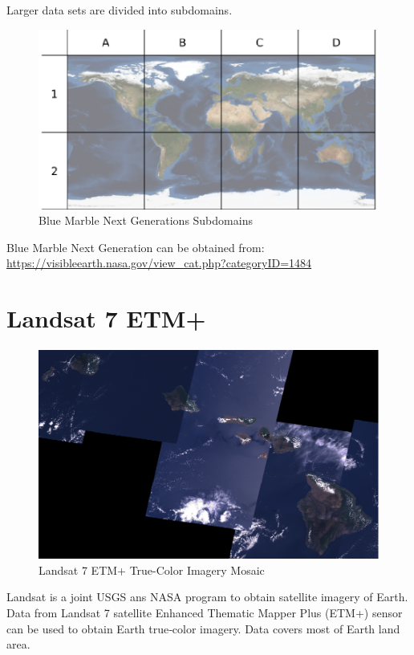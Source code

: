Larger data sets are divided into subdomains.

\begin{figure}[h!]
  \centering
  \includegraphics[width=140mm]{eps/bmng_subdomains.eps}
  \caption{Blue Marble Next Generations Subdomains}
\end{figure}

Blue Marble Next Generation can be obtained from: \cite{Terrain-VisibleEarthBMNG} \\
\url{https://visibleearth.nasa.gov/view_cat.php?categoryID=1484}

\section{Landsat 7 ETM+}

\begin{figure}[h!]
  \centering
  \includegraphics[width=120mm]{eps/landsat_7_etm_hawaii.eps}
  \caption{Landsat 7 ETM+ True-Color Imagery Mosaic}
\end{figure}

Landsat is a joint USGS ans NASA program to obtain satellite imagery of Earth. Data from Landsat 7 satellite Enhanced Thematic Mapper Plus (ETM+) sensor can be used to obtain Earth true‑color imagery. Data covers most of Earth land area.

